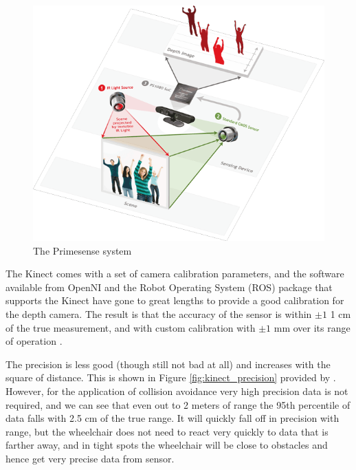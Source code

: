\documentclass[oneside,final,a4paper]{report}
\begin{document}
\begin{figure}[hbt]
 \centering
 \includegraphics[scale=0.35]{PrimeSensor_Depth_Diagram}
 \caption{The Primesense system \cite{primesense}} \label{fig:primesense_solution}
\end{figure}

The Kinect comes with a set of camera calibration parameters, and the software available from OpenNI \cite{OpenNI} and the Robot Operating System (ROS) \cite{ROS} package that supports the Kinect have gone to great lengths to provide a good calibration for the depth camera. The result is that the accuracy of the sensor is within  $\pm 1$ 1 cm of the true measurement, and with custom calibration with $\pm 1$ mm over its range of operation \cite{kinect_prec}.

The precision is less good (though still not bad at all) and increases with the square of distance. This is shown in Figure \ref{fig:kinect_precision} provided by \cite{kinect_prec}. However, for the application of collision avoidance very high precision data is not required, and we can see that even out to 2 meters of range the 95th percentile of data falls with 2.5 cm of the true range. It will quickly fall off in precision with range, but the wheelchair does not need to react very quickly to data that is farther away, and in tight spots the wheelchair will be close to obstacles and hence get very precise data from sensor.
\end{document}

